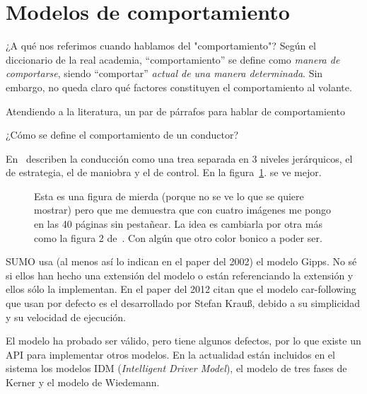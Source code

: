 \section{Modelos de comportamiento}

¿A qué nos referimos cuando hablamos del "comportamiento"? Según el diccionario de la real academia, \enquote{comportamiento} se define como \textit{manera de comportarse}, siendo \enquote{comportar} \textit{actual de una manera determinada}. Sin embargo, no queda claro qué factores constituyen el comportamiento al volante.

Atendiendo a la literatura, \TODO un par de párrafos para hablar de comportamiento

¿Cómo se define el comportamiento de un conductor?

En~\cite{michon1985critical} describen la conducción como una trea separada en $3$ niveles jerárquicos, el de estrategia, el de maniobra y el de control. En la figura~\ref{fig:three-levels-of-human-driving}. se ve mejor.
\begin{figure}
	\centering
{}
	\caption{Esta es una figura de mierda (porque no se ve lo que se quiere mostrar) pero que me demuestra que con cuatro imágenes me pongo en las 40 páginas sin pestañear. La idea es cambiarla por otra más como la figura 2 de~\cite{michon1985critical}. Con algún que otro color bonico a poder ser.}
	\label{fig:three-levels-of-human-driving}
\end{figure}

SUMO usa (al menos así lo indican en el paper del 2002) el modelo Gipps\cite{krajzewicz2002sumo}. No sé si ellos han hecho una extensión del modelo o están referenciando la extensión y ellos sólo la implementan. En el paper del 2012 citan que el modelo car-following que usan por defecto es el desarrollado por Stefan Krauß\cite{jin2016evaluation}, debido a su simplicidad y su velocidad de ejecución.

El modelo ha probado ser válido, pero tiene algunos defectos, por lo que existe un API para implementar otros modelos. En la actualidad están incluidos en el sistema los modelos IDM\cite{treiber2000congested} (\textit{Intelligent Driver Model}), el modelo de tres fases de Kerner\cite{kerner2008testbed} y el modelo de Wiedemann\cite{wiedemann1974simulation}.

